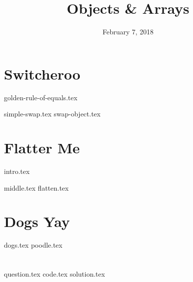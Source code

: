 \documentclass[11pt]{exam}
\title{Objects \& Arrays}
\date{February 7, 2018}
\begin{document}
\maketitle

\section{Switcheroo}
{golden-rule-of-equals.tex}
\begin{questions}
{simple-swap.tex}
{swap-object.tex}
\end{questions}

\newpage
\section{Flatter Me}
{intro.tex}
\begin{questions}
{middle.tex}
{flatten.tex}
\end{questions}

\section{Dogs Yay}
\begin{questions}
{dogs.tex}
{poodle.tex}
\end{questions}

\clearpage

\section{}
\begin{questions}
{question.tex}
{code.tex}
{solution.tex}
\end{questions}
\end{document}
